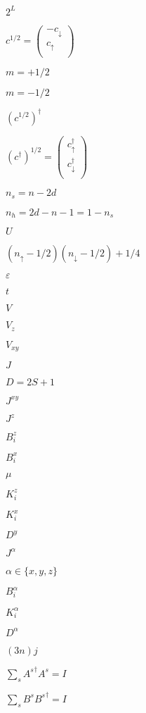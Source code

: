 \documentclass{article}
\begin{document}
$2^L$
\pagebreak

$c^{1/2} = \left(
\begin{array}{c}
-c_{\downarrow} \\
 c_{\uparrow} \\
\end{array}
\right)$
\pagebreak

$ m=+1/2$
\pagebreak

$ m=-1/2$
\pagebreak

$ \left(c^{1/2}\right)^\dagger$
\pagebreak

$\left(c^{\dagger}\right)^{1/2} = \left(
\begin{array}{c}
 c^\dagger_{\uparrow} \\
 c^\dagger_{\downarrow} \\
\end{array}
\right)$
\pagebreak

$n_s=n-2d$
\pagebreak

$n_h=2d-n-1=1-n_s$
\pagebreak

$U$
\pagebreak

$(n_{\uparrow}-1/2)(n_{\downarrow}-1/2)+1/4$
\pagebreak

$\varepsilon$
\pagebreak

$t$
\pagebreak

$V$
\pagebreak

$V_z$
\pagebreak

$V_{xy}$
\pagebreak

$J$
\pagebreak

$D=2S+1$
\pagebreak

$J^{xy}$
\pagebreak

$J^{z}$
\pagebreak

$B^{z}_i$
\pagebreak

$B^{x}_i$
\pagebreak

$\mu$
\pagebreak

$K^{z}_i$
\pagebreak

$K^{x}_i$
\pagebreak

$D^{y}$
\pagebreak

$J^{\alpha}$
\pagebreak

$\alpha \in \{x,y,z\} $
\pagebreak

$B^{\alpha}_i$
\pagebreak

$K^{\alpha}_i$
\pagebreak

$D^{\alpha}$
\pagebreak

$(3n)j$
\pagebreak

$\sum_s {A^s}^\dag A^s=I$
\pagebreak

$\sum_s B^s {B^s}^\dag=I$
\pagebreak
\end{document}
